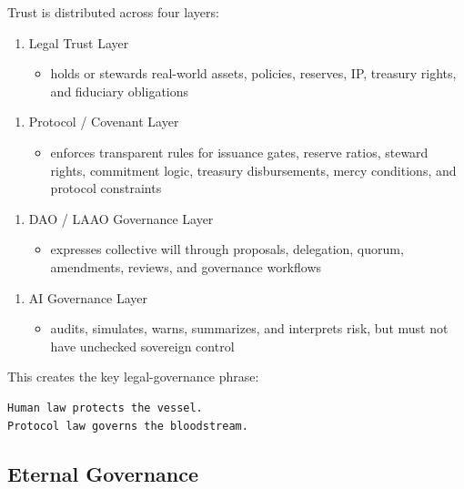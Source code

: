 ﻿\documentclass[12pt]{article}
\begin{document}
Trust is distributed across four layers:

\begin{enumerate}
  \item Legal Trust Layer
\begin{itemize}
  \item holds or stewards real-world assets, policies, reserves, IP, treasury rights, and fiduciary obligations
\end{itemize}
\end{enumerate}

\begin{enumerate}
  \item Protocol / Covenant Layer
\begin{itemize}
  \item enforces transparent rules for issuance gates, reserve ratios, steward rights, commitment logic, treasury disbursements, mercy conditions, and protocol constraints
\end{itemize}
\end{enumerate}

\begin{enumerate}
  \item DAO / LAAO Governance Layer
\begin{itemize}
  \item expresses collective will through proposals, delegation, quorum, amendments, reviews, and governance workflows
\end{itemize}
\end{enumerate}

\begin{enumerate}
  \item AI Governance Layer
\begin{itemize}
  \item audits, simulates, warns, summarizes, and interprets risk, but must not have unchecked sovereign control
\end{itemize}
\end{enumerate}

This creates the key legal-governance phrase:

\begin{verbatim}
Human law protects the vessel.
Protocol law governs the bloodstream.
\end{verbatim}

\subsection{Eternal Governance}
\end{document}
